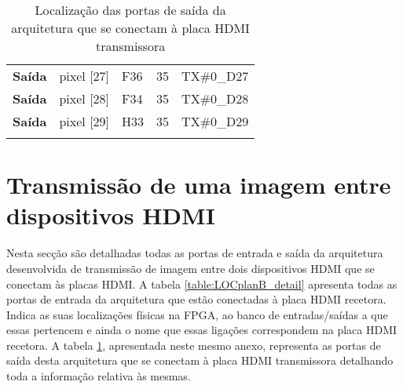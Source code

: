 \begin{longtable}{@{}rllll@{}}
			\multicolumn{1}{r|}{\textbf{Saída}} & pixel {[}27{]}                     & F36                                      & 35                                         & TX\#0\_D27                                      \\
			\multicolumn{1}{r|}{\textbf{Saída}} & pixel {[}28{]}                     & F34                                      & 35                                         & TX\#0\_D28                                      \\
			\multicolumn{1}{r|}{\textbf{Saída}} & pixel {[}29{]}                     & H33                                      & 35                                         & TX\#0\_D29                                      \\  
			\hline 
	\captionsetup{width=0.88\linewidth}	
	\caption{Localização das portas de saída da arquitetura que se conectam à placa HDMI transmissora}
	\label{table:locPlanAdetail}
\end{longtable}
%
%
%
%
%
\section{Transmissão de uma imagem entre dispositivos HDMI} \label{ap3:imagem_RX_TX}
%
Nesta secção são detalhadas todas as portas de entrada e saída da arquitetura desenvolvida de transmissão de imagem entre dois dispositivos HDMI que se conectam às placas HDMI. 
%
A tabela \ref{table:LOCplanB_detail} apresenta todas as portas de entrada da arquitetura que estão conectadas à placa HDMI recetora. Indica as suas localizações físicas na FPGA, ao banco de entradas/saídas a que essas pertencem e ainda o nome que essas ligações correspondem na placa HDMI recetora. A tabela \ref{table:locPlanAdetail}, apresentada neste mesmo anexo, representa as portas de saída desta arquitetura que se conectam à placa HDMI transmissora detalhando toda a informação relativa às mesmas.

